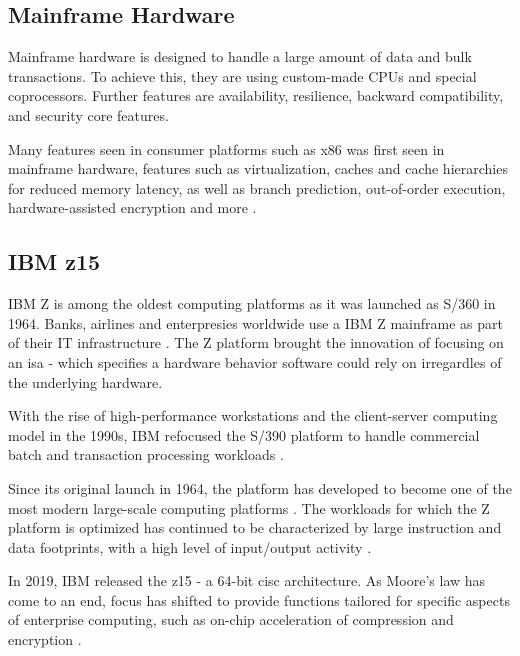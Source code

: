 \subsection{Mainframe Hardware}

Mainframe hardware is designed to handle a large amount of data and bulk transactions. To achieve this, they are using custom-made CPUs and special coprocessors. Further features are availability, resilience, backward compatibility, and security core features.

Many features seen in consumer platforms such as x86 was first seen in mainframe hardware, features such as virtualization, caches and cache hierarchies for reduced memory latency, as well as branch prediction, out-of-order execution, hardware-assisted encryption and more \cite{jacobi2020}.


\subsection{IBM z15}

IBM Z is among the oldest computing platforms as it was launched as S/360 in 1964. Banks, airlines and enterpresies worldwide use a IBM Z mainframe as part of their IT infrastructure \cite{jacobi2020}. The Z platform brought the innovation of focusing on an \acrfull{isa} - which specifies a hardware behavior software could rely on irregardles of the underlying hardware.

With the rise of high-performance workstations and the client-server computing model in the 1990s, IBM refocused the S/390 platform to handle commercial batch and transaction processing workloads \cite{jacobi2020}. 

Since its original launch in 1964, the platform has developed to become one of the most modern large-scale computing platforms \cite{jacobi2020}. The workloads for which the Z platform is optimized has continued to be characterized by large instruction and data footprints, with a high level of input/output activity \cite{jacobi2020}.

In 2019, IBM released the \gls{z15} \cite{jacobi2020} - a 64-bit \gls{cisc} architecture. As Moore's law has come to an end, focus has shifted to provide functions tailored for specific aspects of enterprise computing, such as on-chip acceleration of compression and encryption \cite{jacobi2020}.

